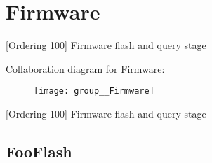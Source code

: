 \hypertarget{group__Firmware}{\section{Firmware}
\label{group__Firmware}
}


\mbox{[}Ordering 100\mbox{]} Firmware flash and query stage  


Collaboration diagram for Firmware\-:\nopagebreak
\begin{figure}[H]
\begin{center}
\leavevmode
\texttt{[image: group\_\_Firmware]}
\end{center}
\end{figure}
\mbox{[}Ordering 100\mbox{]} Firmware flash and query stage \hypertarget{FooFlash.py_FooFlash}{}\subsection{Foo\-Flash}\label{FooFlash.py_FooFlash}
